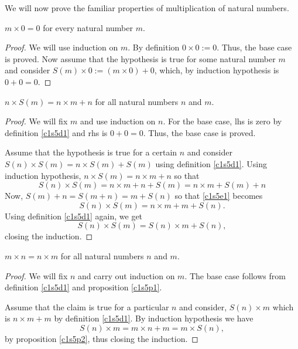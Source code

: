 We will now prove the familiar properties of multiplication of natural
numbers.
\begin{prop}\label{c1s5p1}
$m \times 0 = 0$ for every natural number $m$.
\end{prop}
\begin{proof}
We will use induction on $m$. By definition $0 \times 0 := 0$. Thus, the
base case is proved. Now assume that the hypothesis is true for some 
natural number $m$ and consider $S(m) \times 0 := (m \times 0) + 0$, which,
by induction hypothesis is $0 + 0 = 0$.
\end{proof}

\begin{prop}\label{c1s5p2}
$n \times S(m) = n \times m + n$ for all natural numbers $n$ and $m$.
\end{prop}
\begin{proof}
We will fix $m$ and use induction on $n$. For the base case, lhs is zero by
definition \ref{c1s5d1} and rhs is $0 + 0 = 0$. Thus, the base case is 
proved.

Assume that the hypothesis is true for a certain $n$ and consider $S(n) 
\times S(m) = n \times S(m) + S(m)$ using definition \ref{c1s5d1}. Using 
induction hypothesis, $n \times S(m) = n \times m + n$ so that
\begin{equation}\label{c1s5e1}
S(n) \times S(m) = n \times m + n + S(m) = n \times m + S(m) + n
\end{equation}
Now, $S(m) + n = S(m + n) = m + S(n)$ so that \eqref{c1s5e1} becomes
\begin{equation}\label{c1s5e2}
S(n) \times S(m) = n \times m + m + S(n).
\end{equation}
Using definition \eqref{c1s5d1} again, we get
\begin{equation}\label{c1s5e3}
S(n) \times S(m) = S(n) \times m + S(n),
\end{equation}
closing the induction.
\end{proof}

\begin{prop}\label{c1s5p3}
$m \times n = n \times m$ for all natural numbers $n$ and $m$.
\end{prop}
\begin{proof}
We will fix $n$ and carry out induction on $m$. The base case follows from 
definition \ref{c1s5d1} and proposition \ref{c1s5p1}.

Assume that the claim is true for a particular $n$ and consider, $S(n) 
\times m$ which is $n \times m + m$ by definition \ref{c1s5d1}. By 
induction hypothesis we have
\begin{equation}\label{c1s5e4}
S(n) \times m = m \times n + m = m \times S(n),
\end{equation}
by proposition \ref{c1s5p2}, thus closing the induction.
\end{proof}

